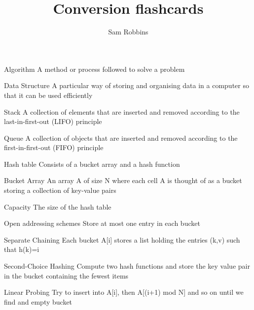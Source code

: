 \documentclass[grid,avery5371]{flashcards}
\title{Conversion flashcards}
\author{Sam Robbins}
\begin{document}
\begin{flashcard}[]{Algorithm}
A method or process followed to solve a problem
\end{flashcard}

\begin{flashcard}[]{Data Structure}
	A particular way of storing and organising data in a computer so that it can be used efficiently 
\end{flashcard}

\begin{flashcard}[]{Stack}
	A collection of elements that are inserted and removed according to the last-in-first-out (LIFO) principle
\end{flashcard}

\begin{flashcard}[]{Queue}
	A collection of objects that are inserted and removed according to the first-in-first-out (FIFO) principle
\end{flashcard}

\begin{flashcard}[]{Hash table}
	Consists of a bucket array and a hash function
\end{flashcard} 

\begin{flashcard}[]{Bucket Array}
	An array A of size N where each cell A is thought of as a bucket storing a collection of key-value pairs
\end{flashcard}

\begin{flashcard}[]{Capacity}
	The size of the hash table
\end{flashcard}

\begin{flashcard}[]{Open addressing schemes}
	Store at most one entry in each bucket
\end{flashcard}

\begin{flashcard}[]{Separate Chaining}
	Each bucket A[i] stores a list holding the entries (k,v) such that h(k)=i
\end{flashcard}

\begin{flashcard}[]{Second-Choice Hashing}
	Compute two hash functions and store the key value pair in the bucket containing the fewest items
\end{flashcard}

\begin{flashcard}[]{Linear Probing}
	Try to insert into A[i], then A[(i+1) mod N] and so on until we find and empty bucket
\end{flashcard}
\end{document}
